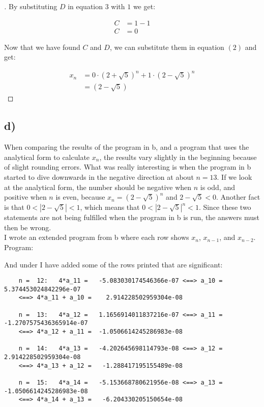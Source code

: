\documentclass{article}
\begin{document}
\begin{proof}[\nopunct]
By substituting $D$ in equation 3 with $1$ we get:

\begin{equation}
    \begin{split}
        C &= 1 - 1 \\
        C &= 0
    \end{split}
\end{equation}

Now that we have found $C$ and $D$, we can substitute them in equation $(2)$ and get:

\begin{equation}
    \begin{split}
        x_n &= 0 \cdot (2 + \sqrt{5})^n + 1 \cdot (2 - \sqrt{5})^n \\
            &= (2 - \sqrt{5})
    \end{split}
\end{equation}
\end{proof}

\subsection*{d)}
When comparing the results of the program in b, and a program that uses the analytical form to calculate $x_n$, the results vary slightly in the beginning because of slight rounding errors.
What was really interesting is when the program in b started to dive downwards in the negative direction at about $n = 13$. If we look at the analytical form, the number should be negative when $n$ is odd, and positive when $n$ is even,
because $x_n = (2-\sqrt{5})^n$ and $2-\sqrt{5} < 0$. Another fact is that $0 < |2-\sqrt{5}| < 1$, which means that $0 < |2-\sqrt{5}|^n < 1$. Since these two statements are not being fulfilled when the program in b is run,
the answers must then be wrong. \\

I wrote an extended program from b where each row shows $x_n$, $x_{n-1}$, and $x_{n-2}$. Program:



\newpage

And under I have added some of the rows printed that are significant:
\begin{verbatim}
    n =  12:   4*a_11 =   -5.083030174546366e-07 <==> a_10 =    5.374453024842296e-07 
    <==> 4*a_11 + a_10 =    2.914228502959304e-08

    n =  13:   4*a_12 =   1.1656914011837216e-07 <==> a_11 =  -1.2707575436365914e-07 
    <==> 4*a_12 + a_11 =  -1.0506614245286983e-08
    
    n =  14:   4*a_13 =   -4.202645698114793e-08 <==> a_12 =    2.914228502959304e-08 
    <==> 4*a_13 + a_12 =   -1.288417195155489e-08

    n =  15:   4*a_14 =   -5.153668780621956e-08 <==> a_13 =  -1.0506614245286983e-08 
    <==> 4*a_14 + a_13 =   -6.204330205150654e-08
\end{verbatim}
\end{document}
